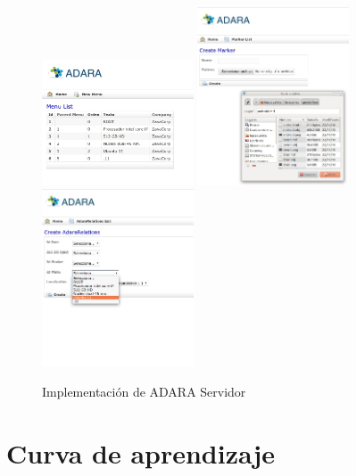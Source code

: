 \documentclass[12pt,a4paper,spanish,openany]{book}
\begin{document}
\begin{figure}
\begin{center}
\includegraphics[width=0.4\textwidth]{./img/servidorAdmin1.jpg}
\includegraphics[width=0.4\textwidth]{./img/servidorAdmin2.jpg}
\includegraphics[width=0.4\textwidth]{./img/servidorUser.jpg}
\caption{Implementación de ADARA Servidor}
\end{center}
\end{figure}










\section{Curva de aprendizaje}
\end{document}
